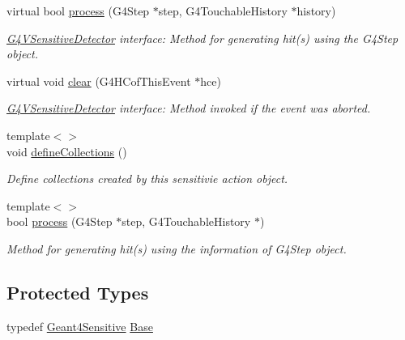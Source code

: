 \begin{DoxyCompactItemize}
virtual bool \hyperlink{class_tests_1_1_geant4_sensitive_action_a6ae919f9aeb71219a38300d3918ed814}{process} (G4\+Step $\ast$step, G4\+Touchable\+History $\ast$history)
\begin{DoxyCompactList}\small\item\em \hyperlink{class_g4_v_sensitive_detector}{G4\+V\+Sensitive\+Detector} interface\+: Method for generating hit(s) using the G4\+Step object. \end{DoxyCompactList}\item 
virtual void \hyperlink{class_tests_1_1_geant4_sensitive_action_a4d02434822c244ee5c5d6aee7e15c993}{clear} (G4\+H\+Cof\+This\+Event $\ast$hce)
\begin{DoxyCompactList}\small\item\em \hyperlink{class_g4_v_sensitive_detector}{G4\+V\+Sensitive\+Detector} interface\+: Method invoked if the event was aborted. \end{DoxyCompactList}\item 
{\footnotesize template$<$$>$ }\\void \hyperlink{class_tests_1_1_geant4_sensitive_action_ae9b3b49c444bf20e0611d8532cbd7d45}{define\+Collections} ()
\begin{DoxyCompactList}\small\item\em Define collections created by this sensitivie action object. \end{DoxyCompactList}\item 
{\footnotesize template$<$$>$ }\\bool \hyperlink{class_tests_1_1_geant4_sensitive_action_aff7223d28e073cbcb4e2347f9514ba75}{process} (G4\+Step $\ast$step, G4\+Touchable\+History $\ast$)
\begin{DoxyCompactList}\small\item\em Method for generating hit(s) using the information of G4\+Step object. \end{DoxyCompactList}\end{DoxyCompactItemize}
\subsection*{Protected Types}
\begin{DoxyCompactItemize}
\item 
typedef \hyperlink{class_d_d4hep_1_1_simulation_1_1_geant4_sensitive}{Geant4\+Sensitive} \hyperlink{class_tests_1_1_geant4_sensitive_action_afb2235077e4e86f00859155e5379bbad}{Base}
\end{DoxyCompactItemize}
